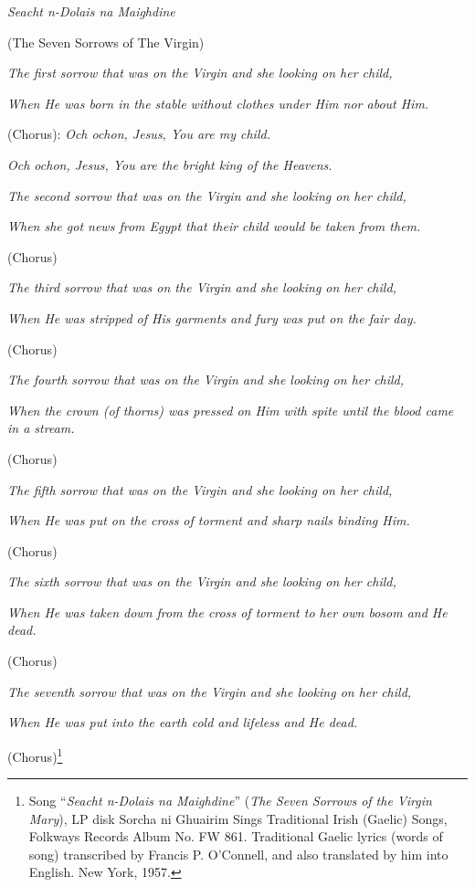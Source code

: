 \begin{quotex}
\emph{Seacht n-Dolais na Maighdine}

(The Seven Sorrows of The Virgin)

\emph{The first sorrow that was on the Virgin and she looking on her child,}

\emph{When He was born in the stable without clothes under Him nor about Him.}

(Chorus): \emph{Och ochon, Jesus, You are my child.}

\emph{Och ochon, Jesus, You are the bright king of the Heavens.}

\emph{The second sorrow that was on the Virgin and she looking on her child,}

\emph{When she got news from Egypt that their child would be taken from them.}

(Chorus)

\emph{The third sorrow that was on the Virgin and she looking on her child,}

\emph{When He was stripped of His garments and fury was put on the fair day.}

(Chorus)

\emph{The fourth sorrow that was on the Virgin and she looking on her child,}

\emph{When the crown (of thorns) was pressed on Him with spite until the blood came in a stream.}

(Chorus)

\emph{The fifth sorrow that was on the Virgin and she looking on her child,}

\emph{When He was put on the cross of torment and sharp nails binding Him.}

(Chorus)

\emph{The sixth sorrow that was on the Virgin and she looking on her child,}

\emph{When He was taken down from the cross of torment to her own bosom and He dead.}

(Chorus)

\emph{The seventh sorrow that was on the Virgin and she looking on her child,}

\emph{When He was put into the earth cold and lifeless and He dead.}

(Chorus)\footnote{Song ``\emph{Seacht n-Dolais na Maighdine}'' (\emph{The Seven Sorrows of the Virgin Mary}), LP disk Sorcha ni Ghuairim Sings Traditional Irish (Gaelic) Songs, Folkways Records Album No. FW 861. Traditional Gaelic lyrics (words of song) transcribed by Francis P. O'Connell, and also translated by him into English. New York, 1957.}


\end{quotex}
